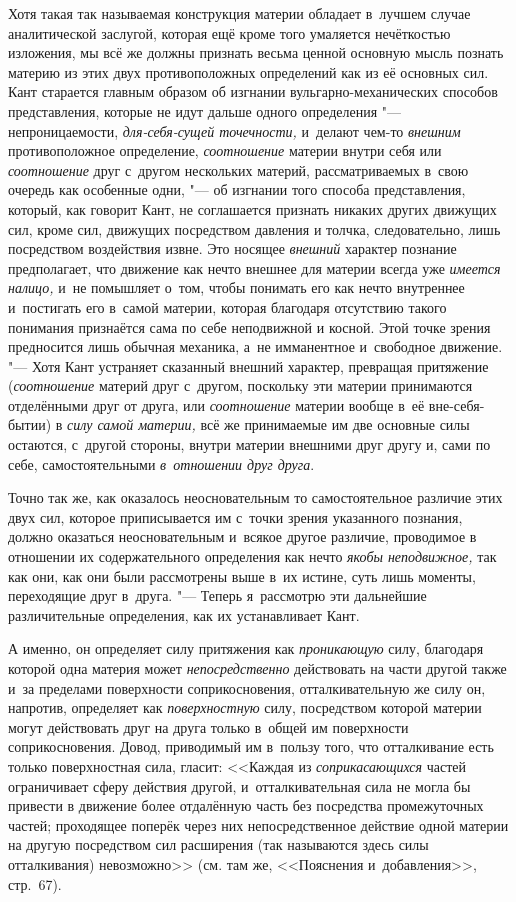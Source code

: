 Хотя такая так называемая конструкция материи обладает в~лучшем случае
аналитической заслугой, которая ещё кроме того умаляется нечёткостью
изложения, мы всё же должны признать весьма ценной основную мысль познать
материю из этих двух противоположных определений как из её основных сил.
Кант старается главным образом об изгнании вульгарно-механических способов
представления, которые не идут дальше одного определения "---
непроницаемости, {\em для-себя-сущей точечности,} и~делают чем-то
{\em внешним} противоположное определение,
{\em соотношение} материи внутри себя или
{\em соотношение} друг с~другом нескольких материй,
рассматриваемых в~свою очередь как особенные одни, "--- об изгнании того
способа представления, который, как говорит Кант, не соглашается признать
никаких других движущих сил, кроме сил, движущих посредством давления и
толчка, следовательно, лишь посредством воздействия извне. Это носящее
{\em внешний} характер познание предполагает, что
движение как нечто внешнее для материи всегда уже
{\em имеется налицо,} и~не помышляет о~том, чтобы
понимать его как нечто внутреннее и~постигать его в~самой материи, которая
благодаря отсутствию такого понимания признаётся сама по себе неподвижной и
косной. Этой точке зрения предносится лишь обычная механика, а~не
имманентное и~свободное движение. "--- Хотя Кант устраняет сказанный внешний
характер, превращая притяжение ({\em соотношение}
материй друг с~другом, поскольку эти материи принимаются отделёнными друг
от друга, или {\em соотношение} материи вообще в~её
вне-себя-бытии) в {\em силу самой материи,} всё же
принимаемые им две основные силы остаются, с~другой стороны, внутри материи
внешними друг другу и, сами по себе, самостоятельными
{\em в~отношении друг друга}.

Точно так же, как оказалось неосновательным то самостоятельное различие этих
двух сил, которое приписывается им с~точки зрения указанного познания,
должно оказаться неосновательным и~всякое другое различие, проводимое в
отношении их содержательного определения как нечто
{\em якобы неподвижное,} так как они, как они были
рассмотрены выше в~их истине, суть лишь моменты, переходящие друг в~друга.
"--- Теперь я~рассмотрю эти дальнейшие различительные определения, как их
устанавливает Кант.

А именно, он определяет силу притяжения как
{\em проникающую} силу, благодаря которой одна материя
может {\em непосредственно} действовать на части другой
также и~за пределами поверхности соприкосновения, отталкивательную же силу
он, напротив, определяет как {\em поверхностную} силу,
посредством которой материи могут действовать друг на друга только в~общей
им поверхности соприкосновения. Довод, приводимый им в~пользу того, что
отталкивание есть только поверхностная сила, гласит:
<<Каждая из {\em соприкасающихся} частей ограничивает
сферу действия другой, и~отталкивательная сила не могла бы привести в
движение более отдалённую часть без посредства промежуточных частей;
проходящее поперёк через них непосредственное действие одной материи на
другую посредством сил расширения (так называются здесь силы отталкивания)
невозможно>> (см. там же, <<Пояснения и~добавления>>, стр.~67).


